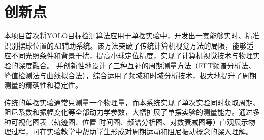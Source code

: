 \section{创新点}
\begin{MainBox}
\quad\quad 本项目首次将YOLO目标检测算法应用于单摆实验中，开发出一套能够实时、精准识别摆球位置的AI辅助系统。该方法突破了传统计算机视觉方法的局限，能够适应不同光照条件和背景干扰，提高小球定位精度，实现了计算机视觉技术与物理实验的深度融合。
并创新性地设计了三种互补的周期测量方法（FFT频谱分析法、峰值检测法与曲线拟合法），综合运用了频域和时域分析技术，极大地提升了周期测量的精确性和稳定性。
\end{MainBox}


\begin{MainBox}
\quad\quad 传统的单摆实验通常只测量一个物理量，而本系统实现了单次实验同时获取周期、阻尼系数和振幅变化等全部动力学参数，大幅扩展了单摆实验的测量能力。通过多种可视化图表（轨迹图、位置-时间图、频谱分析图、对数衰减图等）直观展示物理过程，可在实验教学中帮助学生形成对周期运动和阻尼振动概念的深入理解。
\end{MainBox}


